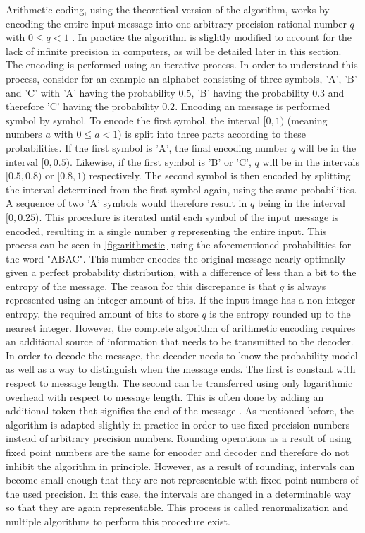 Arithmetic coding, using the theoretical version of the algorithm, works by encoding the entire input message into one arbitrary-precision rational number $q$ with $0 \leq q < 1$ \citep{said_introduction_2023}. In practice the algorithm is slightly modified to account for the lack of infinite precision in computers, as will be detailed later in this section. The encoding is performed using an iterative process. In order to understand this process, consider for an example an alphabet consisting of three symbols, 'A', 'B' and 'C' with 'A' having the probability $0.5$, 'B' having the probability $0.3$ and therefore 'C' having the probability $0.2$. Encoding an message is performed symbol by symbol. To encode the first symbol, the interval $[0,1)$ (meaning numbers $a$ with $0 \leq a < 1$) is split into three parts according to these probabilities. If the first symbol is 'A', the final encoding number $q$ will be in the interval $[0,0.5)$. Likewise, if the first symbol is 'B' or 'C', $q$ will be in the intervals $[0.5,0.8)$ or $[0.8,1)$ respectively. The second symbol is then encoded by splitting the interval determined from the first symbol again, using the same probabilities. A sequence of two 'A' symbols would therefore result in $q$ being in the interval $[0,0.25)$. This procedure is iterated until each symbol of the input message is encoded, resulting in a single number $q$ representing the entire input. This process can be seen in \autoref{fig:arithmetic} using the aforementioned probabilities for the word "ABAC". This number encodes the original message nearly optimally given a perfect probability distribution, with a difference of less than a bit to the entropy of the message. The reason for this discrepance is that $q$ is always represented using an integer amount of bits. If the input image has a non-integer entropy, the required amount of bits to store $q$ is the entropy rounded up to the nearest integer. However, the complete algorithm of arithmetic encoding requires an additional source of information that needs to be transmitted to the decoder. In order to decode the message, the decoder needs to know the probability model as well as a way to distinguish when the message ends. The first is constant with respect to message length. The second can be transferred using only logarithmic overhead with respect to message length. This is often done by adding an additional token that signifies the end of the message \citep{said_introduction_2023}.
As mentioned before, the algorithm is adapted slightly in practice in order to use fixed precision numbers instead of arbitrary precision numbers. Rounding operations as a result of using fixed point numbers are the same for encoder and decoder and therefore do not inhibit the algorithm in principle. However, as a result of rounding, intervals can become small enough that they are not representable with fixed point numbers of the used precision. In this case, the intervals are changed in a determinable way so that they are again representable. This process is called renormalization and multiple algorithms to perform this procedure exist.
